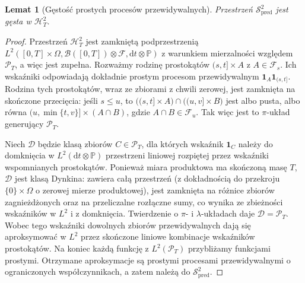 \documentclass[11pt,a4paper,oneside]{report}
\numberwithin{equation}{chapter}
\theoremstyle{plain}
\newtheorem{lemat}[twierdzenie]{Lemat}
\theoremstyle{definition}
\theoremstyle{remark}
\newcommand{\Prob}{\mathbb{P}}
\newcommand{\calF}{\mathcal{F}}
\newcommand{\calH}{\mathcal{H}}
\newcommand{\calB}{\mathcal{B}}
\newcommand{\calP}{\mathcal{P}}
\newcommand{\calD}{\mathcal{D}}
\newcommand{\calS}{\mathcal{S}}
\newcommand{\ind}[1]{\mathbf{1}_{#1}}
\newcommand{\dd}{\mathrm{d}}
\begin{document}
\begin{lemat}[Gęstość prostych procesów przewidywalnych]\label{lem:volIII:02:02}
\label{lem:pred-dense}
Przestrzeń $\calS_{\mathrm{pred}}^2$ jest gęsta w
$\calH_T^2$.
\end{lemat}
\begin{proof}
Przestrzeń $\calH_T^2$ jest zamkniętą podprzestrzenią
$L^2([0,T]\times\Omega,\calB([0,T])\otimes\calF,
\dd t\otimes\Prob)$ z warunkiem mierzalności względem
$\calP_T$, a więc jest zupełna.
Rozważmy rodzinę prostokątów $(s,t]\times A$ z
$A\in\calF_s$. Ich wskaźniki odpowiadają dokładnie
prostym procesom przewidywalnym
$\ind A\ind{(s,t]}$. Rodzina tych prostokątów, wraz
ze zbiorami z chwili zerowej, jest zamknięta na
skończone przecięcia: jeśli $s\le u$, to
$\big((s,t]\times A\big)\cap\big((u,v]\times B\big)$
jest albo pusta, albo równa
$(u,\min\{t,v\}]\times(A\cap B)$, gdzie
$A\cap B\in\calF_u$. Tak więc jest to $\pi$-układ
generujący $\calP_T$.

Niech $\calD$ będzie klasą zbiorów $C\in\calP_T$,
dla których wskaźnik $\ind C$ należy do domknięcia
w $L^2(\dd t\otimes\Prob)$ przestrzeni liniowej
rozpiętej przez wskaźniki wspomnianych prostokątów.
Ponieważ miara produktowa ma skończoną masę $T$,
$\calD$ jest klasą Dynkina: zawiera całą przestrzeń
(z dokładnością do przekroju $\{0\}\times\Omega$ o
zerowej mierze produktowej), jest zamknięta na różnice
zbiorów zagnieżdżonych oraz na przeliczalne rozłączne
sumy, co wynika ze zbieżności wskaźników w $L^2$
i z domknięcia. Twierdzenie o $\pi$- i $\lambda$-układach
daje $\calD=\calP_T$. Wobec tego wskaźniki dowolnych
zbiorów przewidywalnych dają się aproksymować w $L^2$
przez skończone liniowe kombinacje wskaźników prostokątów.
Na koniec każdą funkcję z $L^2(\calP_T)$ przybliżamy
funkcjami prostymi. Otrzymane aproksymacje są
prostymi procesami przewidywalnymi o ograniczonych
współczynnikach, a zatem należą do
$\calS_{\mathrm{pred}}^2$.
\end{proof}
\end{document}
